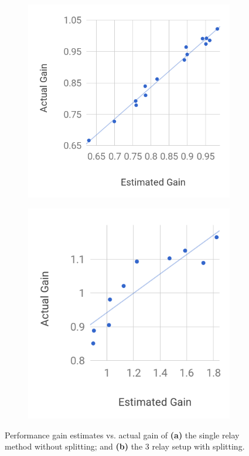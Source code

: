 \documentclass[sigconf,usenames,dvipsnames,geometry]{acmart}
\providecommand{\vs}{vs. }
\begin{document}
\begin{figure}[t]
  \centering
  
    \begin{subfigure}{0.47\columnwidth}
  \centering
  \includegraphics[width=\columnwidth]{figures/gainEstimateVsActual-nat-1hop-newer}
    \caption{}
    \label{fig:rtt-estimate-nat-1hop}
\end{subfigure} \hfill
\begin{subfigure}{0.47\columnwidth}
  \centering
  \includegraphics[width=\columnwidth]{figures/gainEstimateVsActual-ssh-3hop-newer}
    \caption{} \label{fig:rtt-estimate-ssh-3hop}
\end{subfigure}
    \caption{Performance gain estimates \vs actual gain of \textbf{(a)} the single relay method without splitting; and \textbf{(b)} the 3 relay setup with splitting.}
\end{figure}
\end{document}
